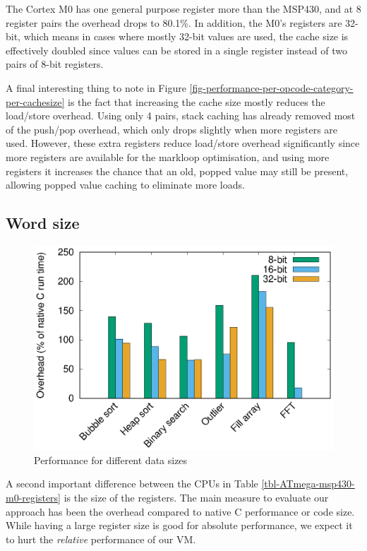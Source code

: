 The Cortex M0 has one general purpose register more than the MSP430, and at 8 register pairs the overhead drops to 80.1\%. In addition, the M0's registers are 32-bit, which means in cases where mostly 32-bit values are used, the cache size is effectively doubled since values can be stored in a single register instead of two pairs of 8-bit registers.

A final interesting thing to note in Figure \ref{fig-performance-per-opcode-category-per-cachesize} is the fact that increasing the cache size mostly reduces the load/store overhead. Using only 4 pairs, stack caching has already removed most of the push/pop overhead, which only drops slightly when more registers are used. However, these extra registers reduce load/store overhead significantly since more registers are available for the markloop optimisation, and using more registers it increases the chance that an old, popped value may still be present, allowing popped value caching to eliminate more loads.

\subsection{Word size}
\label{sec-evaluation-other-platforms-word-size}

\begin{figure}
\centering
\includegraphics[width=\mygraphsize]{8_16_32_bit.eps}
\caption{Performance for different data sizes}
\label{fig-performance-8-16-32-bit}
\end{figure}



A second important difference between the CPUs in Table \ref{tbl-ATmega-msp430-m0-registers} is the size of the registers. The main measure to evaluate our approach has been the overhead compared to native C performance or code size. While having a large register size is good for absolute performance, we expect it to hurt the \emph{relative} performance of our VM.

